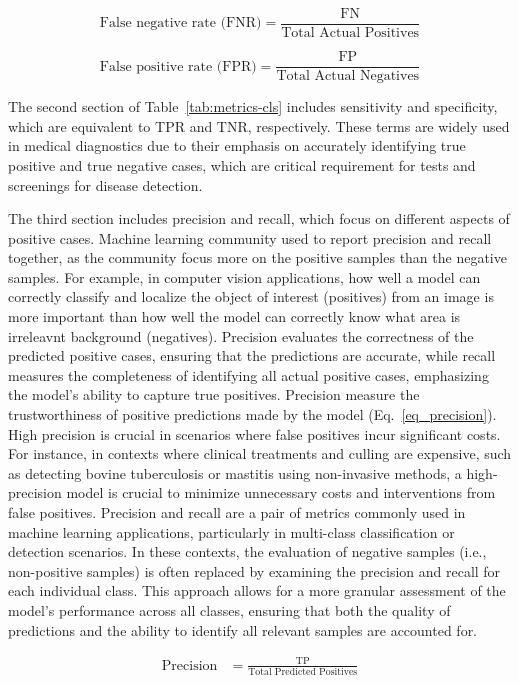 $$
\text{False negative rate (FNR)} = \frac{\text{FN}}{\text{Total Actual Positives}}
$$

$$
\text{False positive rate (FPR)} = \frac{\text{FP}}{\text{Total Actual Negatives}}
$$

The second section of Table~\ref{tab:metrics-cls} includes sensitivity and specificity, which are equivalent to TPR and TNR, respectively. These terms are widely used in medical diagnostics due to their emphasis on accurately identifying true positive and true negative cases, which are critical requirement for tests and screenings for disease detection.

The third section includes precision and recall, which focus on different aspects of positive cases. 
Machine learning community used to report precision and recall together, as the community focus more on the positive samples than the negative samples. For example, in computer vision applications, how well a model can correctly classify and localize the object of interest (positives) from an image is more important than how well the model can correctly know what area is irreleavnt background (negatives). Precision evaluates the correctness of the predicted positive cases, ensuring that the predictions are accurate, while recall measures the completeness of identifying all actual positive cases, emphasizing the model’s ability to capture true positives. Precision measure the trustworthiness of positive predictions made by the model (Eq.~\ref{eq_precision}). High precision is crucial in scenarios where false positives incur significant costs. For instance, in contexts where clinical treatments and culling are expensive, such as detecting bovine tuberculosis \citep{denholm_predicting_2020} or mastitis \citep{kandeel_ability_2019} using non-invasive methods, a high-precision model is crucial to minimize unnecessary costs and interventions from false positives. Precision and recall are a pair of metrics commonly used in machine learning applications, particularly in multi-class classification or detection scenarios. In these contexts, the evaluation of negative samples (i.e., non-positive samples) is often replaced by examining the precision and recall for each individual class. This approach allows for a more granular assessment of the model’s performance across all classes, ensuring that both the quality of predictions and the ability to identify all relevant samples are accounted for.

\begin{equation} \label{eq_precision}
    \begin{split}
    \text{Precision} &= \frac{\text{TP}}{\text{Total Predicted Positives}}
    \end{split}
\end{equation}

